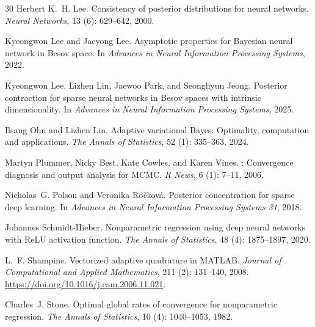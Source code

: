 \documentclass[11pt,a4paper]{article}
\theoremstyle{remark}
\begin{document}
\begin{thebibliography}{30}
Herbert K.~H. Lee.
\newblock Consistency of posterior distributions for neural networks.
\newblock \emph{Neural Networks}, 13 (6): 629--642, 2000.

Kyeongwon Lee and Jaeyong Lee.
\newblock Asymptotic properties for {B}ayesian neural network in {B}esov space.
\newblock In \emph{Advances in Neural Information Processing Systems}, 2022.

Kyeongwon Lee, Lizhen Lin, Jaewoo Park, and Seonghyun Jeong.
\newblock Posterior contraction for sparse neural networks in {Besov} spaces
  with intrinsic dimensionality.
\newblock In \emph{Advances in Neural Information Processing Systems}, 2025.

Ilsang Ohn and Lizhen Lin.
\newblock Adaptive variational {Bayes}: Optimality, computation and
  applications.
\newblock \emph{The Annals of Statistics}, 52 (1): 335--363,
  2024.

Martyn Plummer, Nicky Best, Kate Cowles, and Karen Vines.
: Convergence diagnosis and output analysis for {MCMC}.
\newblock \emph{R News}, 6 (1): 7--11, 2006.

Nicholas~G. Polson and Veronika Ro{\v c}kov{\'a}.
\newblock Posterior concentration for sparse deep learning.
\newblock In \emph{Advances in Neural Information Processing Systems 31}, 2018.

Johannes Schmidt-Hieber.
\newblock Nonparametric regression using deep neural networks with {ReLU}
  activation function.
\newblock \emph{The Annals of Statistics}, 48 (4):
  1875--1897, 2020.

L.~F. Shampine.
\newblock Vectorized adaptive quadrature in {MATLAB}.
\newblock \emph{Journal of Computational and Applied Mathematics},
  211 (2): 131--140, 2008.
\newblock \url{https://doi.org/10.1016/j.cam.2006.11.021}.

Charles~J. Stone.
\newblock Optimal global rates of convergence for nonparametric regression.
\newblock \emph{The Annals of Statistics}, 10 (4):
  1040--1053, 1982.


\end{thebibliography}
\end{document}
